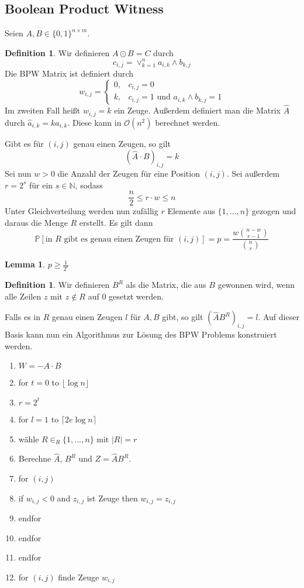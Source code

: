 \documentclass[a4paper, 12pt]{article}
\theoremstyle{plain}
\theoremstyle{definition}
\newtheorem{definition}[theorem]{Definition} %
\theoremstyle{lemma}
\newtheorem{lemma}[theorem]{Lemma}
\theoremstyle{remark}
\theoremstyle{corollary}
\theoremstyle{example}
\begin{document}
	\subsection{Boolean Product Witness}
	Seien $A,B \in \{0,1\}^{n\times m}$.
	\begin{definition}
		Wir definieren $A\odot B = C$ durch \[c_{i,j} = \lor_{k=1}^n a_{i,k} \land b_{k,j}\]
		Die BPW Matrix ist definiert durch \[w_{i,j} = \begin{cases}
			0, & c_{i,j} = 0\\
			k, & c_{i,j} = 1 \text{ und } a_{i,k} \land b_{k,j} = 1
		\end{cases}\]
	Im zweiten Fall heißt $w_{i,j} = k$ ein Zeuge.
	Außerdem definiert man die Matrix $\hat{A}$ durch $\hat{a}_{i,k} = k a_{i,k}$. Diese kann in $\mathcal{O}(n^2)$ berechnet werden.
	\end{definition}
	Gibt es für $(i,j)$ genau einen Zeugen, so gilt \[(\hat{A}\cdot B)_{i,j} = k\]
	Sei nun $w>0$ die Anzahl der Zeugen für eine Position $(i,j)$. Sei außerdem $r = 2^s$ für ein $s \in \mathbb{N}$, sodass $$\frac{n}{2} \leq r\cdot w \leq n$$
	Unter Gleichverteilung werden nun zufällig $r$ Elemente aus $\{1,...,n\}$ gezogen und daraus die Menge $R$ erstellt. Es gilt dann \[\mathbb{P}[\text{in $R$ gibt es genau einen Zeugen für $(i,j)$}] = p = \frac{w\binom{n-w}{r-1}}{\binom{n}{r}}\]
	\begin{lemma}
		$p \geq \frac{1}{2^e}$
	\end{lemma}
	\begin{definition}
		Wir definieren $B^R$ als die Matrix, die aus $B$ gewonnen wird, wenn alle Zeilen $z$ mit $z \notin R$ auf 0 gesetzt werden.
	\end{definition}
	Falls es in $R$ genau einen Zeugen $l$ für $A,B$ gibt, so gilt $(\hat{A}B^R)_{i,j} = l$. 
	Auf dieser Basis kann nun ein Algorithmus zur Lösung des BPW Problems konstruiert werden.
	\begin{enumerate}
		\item $W = -A\cdot B$
		\item for $t=0$ to $\lfloor\log n\rfloor$
		\item $r = 2^t$
		\item for $l = 1$ to $\lceil2e \log n\rceil$
		\item wähle $R \in_R \{1,...,n\}$ mit $\left|R\right| = r$
		\item Berechne $\hat{A}$, $B^R$ und $Z = \hat{A} B^R$.
		\item for $(i,j)$
		\item if $w_{i,j}<0$ and $z_{i,j}$ ist Zeuge then $w_{i,j} = z_{i,j}$
		\item endfor
		\item endfor
		\item endfor
		\item for $(i,j)$ finde Zeuge $w_{i,j}$
	\end{enumerate}
\end{document}
